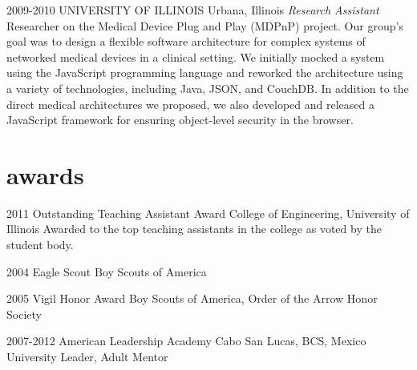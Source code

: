 \documentclass{friggeri-cv} %
\begin{document}
\begin{entrylist}
\entry
{2009-2010}
{UNIVERSITY OF ILLINOIS}
{Urbana, Illinois}
{\emph{Research Assistant} \\
Researcher on the Medical Device Plug and Play (MDPnP) project. Our group's goal was to design a flexible software architecture for complex systems of networked medical devices in a clinical setting. We initially mocked a system using the JavaScript programming language and reworked the architecture using a variety of technologies, including Java, JSON, and CouchDB. In addition to the direct medical architectures we proposed, we also developed and released a JavaScript framework for ensuring object-level security in the browser.}
\end{entrylist}

\pagebreak
\section{awards}

\begin{entrylist}
\entry
{2011}
{Outstanding Teaching Assistant Award}
{College of Engineering, University of Illinois}
{Awarded to the top teaching assistants in the college as voted by the student body.}
\end{entrylist}
\begin{entrylist}
\entry
{2004}
{Eagle Scout}
{Boy Scouts of America}
{}
\end{entrylist}
\begin{entrylist}
\entry
{2005}
{Vigil Honor Award}
{Boy Scouts of America, Order of the Arrow Honor Society}
{}
\end{entrylist}
\begin{entrylist}
\entry
{2007-2012}
{American Leadership Academy}
{Cabo San Lucas, BCS, Mexico}
{University Leader, Adult Mentor}
\end{entrylist}

\end{document}
